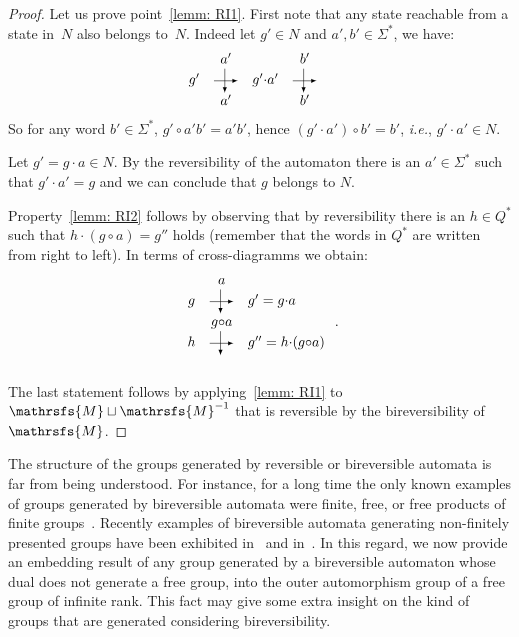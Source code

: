 \documentclass{amsart}
\begin{document}
\begin{proof}
Let us prove point~\ref{lemm: RI1}. First note that any state reachable from a
state in~\(N\) also belongs to~\(N\). Indeed let \(g'\in N\) and $a',b'\in {{{\Sigma}}}^*$, we have:
\[
\begin{array}{c c c c c c}

	&	a'		&		& b'	&	\\
g'	&	{\tikz[baseline=-.5ex]{\draw[->,>=latex] (0,0) -- (4ex,0); \draw[->,>=latex] (1.8ex,2ex) -- (1.8ex,-2ex);}}	&	g'{{{\cdot}}} a'	&{\tikz[baseline=-.5ex]{\draw[->,>=latex] (0,0) -- (4ex,0); \draw[->,>=latex] (1.8ex,2ex) -- (1.8ex,-2ex);}}	& \\
	&	a'		&		& b'	&	\\
\end{array}
\]
So for any word $b' \in {{{\Sigma}}}^*$, $g'{{{\circ}}} a'b'=a'b'$, hence $(g'{{{\cdot}}} a'){{{\circ}}} b'=b'$,
\emph{i.e.}, $g'{{{\cdot}}} a'\in N$.

 Let $g'=g{{{\cdot}}} a \in N$. By the reversibility of the automaton
 there is an $ a' \in {{{\Sigma}}}^*$ such that $ g'{{{\cdot}}} a'=g$ and
 we can conclude that \(g\) belongs to \(N\).
 
Property~\ref{lemm: RI2} follows by observing that by reversibility there is an $h\in {{{Q}}}^{*}$ such that $h{{{\cdot}}} (g{{{\circ}}} a)=g''$ holds (remember that the words in ${{{Q}}}^{*}$ are written from right to left). In terms of cross-diagramms we obtain:\\
\[
\begin{array}{c c l}

	&	a			&	\\	
g	&	{\tikz[baseline=-.5ex]{\draw[->,>=latex] (0,0) -- (4ex,0); \draw[->,>=latex] (1.8ex,2ex) -- (1.8ex,-2ex);}}	&	g'=g{{{\cdot}}} a \\
	&	g{{{\circ}}} a	&	\\
h	&{\tikz[baseline=-.5ex]{\draw[->,>=latex] (0,0) -- (4ex,0); \draw[->,>=latex] (1.8ex,2ex) -- (1.8ex,-2ex);}}		&	g'' = h{{{\cdot}}} (g{{{\circ}}} a)\\
	& 			&	
\end{array}
\:.
\]
The last statement follows by applying~\ref{lemm: RI1} to ${{{\mathrsfs{{M}}}}}\sqcup {{{\mathrsfs{{M}}}}}^{-1}$ that is reversible by the bireversibility of~${{{\mathrsfs{{M}}}}}$.
\end{proof}

The structure of the groups generated by reversible or bireversible automata is far from being understood. For instance, for a long time the only known examples of groups generated by bireversible automata were finite, free, or free products of finite groups~\cite{VoVo07, VoVo10, Nekra05}. Recently examples of bireversible automata generating non-finitely presented groups have been exhibited in~\cite{BoDaRo} and in~\cite{KiPiSa15a,SavSid}. In this regard, we now provide an embedding result of any group generated by a bireversible automaton whose dual does not generate a free group, into the outer automorphism group of a free group of infinite rank. This fact may give some extra insight on the kind of groups that are generated considering bireversibility.
\end{document}
